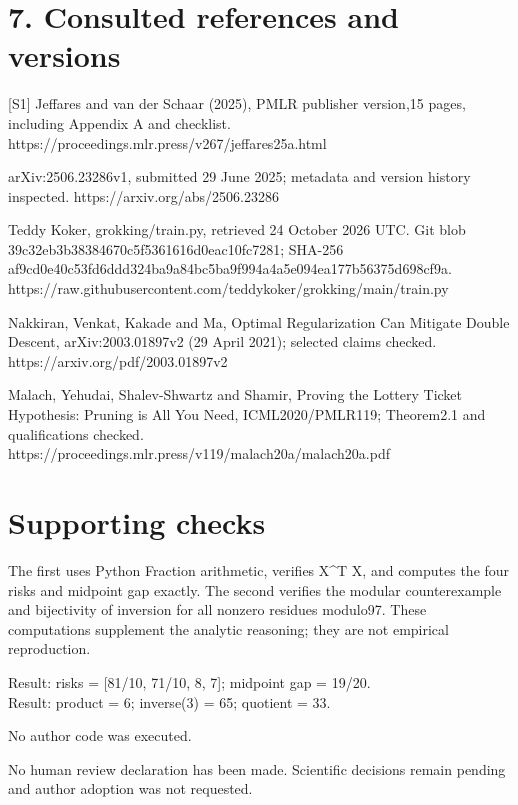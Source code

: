 \documentclass[10pt]{article}
\begin{document}
\section*{7. Consulted references and versions}
[S1] Jeffares and van der Schaar (2025), PMLR publisher version,15 pages, including Appendix A and checklist.
https://proceedings.mlr.press/v267/jeffares25a.html\par
[S2] arXiv:2506.23286v1, submitted 29 June 2025; metadata and version history inspected.
https://arxiv.org/abs/2506.23286\par
[S3] Teddy Koker, grokking/train.py, retrieved 24 October 2026 UTC. Git blob 39c32eb3b38384670c5f5361616d0eac10fc7281; SHA-256 af9cd0e40c53fd6ddd324ba9a84bc5ba9f994a4a5e094ea177b56375d698cf9a.
https://raw.githubusercontent.com/teddykoker/grokking/main/train.py\par
[S4] Nakkiran, Venkat, Kakade and Ma, Optimal Regularization Can Mitigate Double Descent, arXiv:2003.01897v2 (29 April 2021); selected claims checked.
https://arxiv.org/pdf/2003.01897v2\par
[S5] Malach, Yehudai, Shalev-Shwartz and Shamir, Proving the Lottery Ticket Hypothesis: Pruning is All You Need, ICML2020/PMLR119; Theorem2.1 and qualifications checked.
https://proceedings.mlr.press/v119/malach20a/malach20a.pdf\par
\section*{Supporting checks}
The first uses Python Fraction arithmetic, verifies X\textasciicircum{}T X, and computes the four risks and midpoint gap exactly. The second verifies the modular counterexample and bijectivity of inversion for all nonzero residues modulo97. These computations supplement the analytic reasoning; they are not empirical reproduction.\par
{\ttfamily\footnotesize Result: risks = [81/10, 71/10, 8, 7]; midpoint gap = 19/20.\\
Result: product = 6; inverse(3) = 65; quotient = 33.}\par
No author code was executed.\par
No human review declaration has been made. Scientific decisions remain pending and author adoption was not requested.\par
\end{document}
